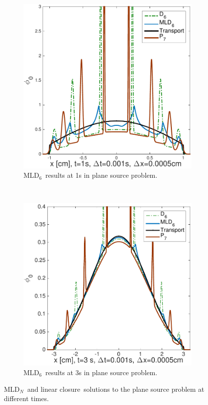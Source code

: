 \documentclass[review]{elsarticle}
\newcommand{\dn}{D$_N$}
\begin{document}
\begin{figure}[ht!]
	\begin{subfigure}{.5\textwidth}
		\centering
		\hspace*{-1cm}\includegraphics[width=1.\linewidth]{ml6_1s2.pdf}
		\caption{MLD$_6$\ results at 1s in plane source problem.}
		\label{f:mld4}
	\end{subfigure}
	~
	\begin{subfigure}{.5\textwidth}
		\centering
		\includegraphics[width=1.\linewidth]{ml6_3s2.pdf}
		\caption{MLD$_6$\ results at 3s in plane source problem.}
		\label{f:mld6}
	\end{subfigure}
	\caption{ML\dn~and linear closure~solutions to the plane source problem at different times.}
	\label{mls}
\end{figure}
\end{document}
